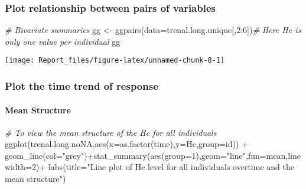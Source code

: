 \documentclass[
]{article}
\newenvironment{Shaded}{\begin{snugshade}}{\end{snugshade}}
\newcommand{\AttributeTok}[1]{\textcolor[rgb]{0.77,0.63,0.00}{#1}}
\newcommand{\CommentTok}[1]{\textcolor[rgb]{0.56,0.35,0.01}{\textit{#1}}}
\newcommand{\DecValTok}[1]{\textcolor[rgb]{0.00,0.00,0.81}{#1}}
\newcommand{\FunctionTok}[1]{\textcolor[rgb]{0.00,0.00,0.00}{#1}}
\newcommand{\NormalTok}[1]{#1}
\newcommand{\OtherTok}[1]{\textcolor[rgb]{0.56,0.35,0.01}{#1}}
\newcommand{\SpecialCharTok}[1]{\textcolor[rgb]{0.00,0.00,0.00}{#1}}
\newcommand{\StringTok}[1]{\textcolor[rgb]{0.31,0.60,0.02}{#1}}
\begin{document}
\hypertarget{plot-relationship-between-pairs-of-variables}{%
\subsubsection{Plot relationship between pairs of
variables}\label{plot-relationship-between-pairs-of-variables}}

\begin{Shaded}
\begin{Highlighting}[]
\CommentTok{\# Bivariate summaries}
\NormalTok{gg }\OtherTok{\textless{}{-}} \FunctionTok{ggpairs}\NormalTok{(}\AttributeTok{data=}\NormalTok{trenal.long.unique[,}\DecValTok{2}\SpecialCharTok{:}\DecValTok{6}\NormalTok{])}\CommentTok{\# Here Hc is only one value per individual}
\NormalTok{gg}
\end{Highlighting}
\end{Shaded}

\begin{center}\texttt{[image: Report\_files/figure-latex/unnamed-chunk-8-1]} \end{center}

\hypertarget{plot-the-time-trend-of-response}{%
\subsubsection{Plot the time trend of
response}\label{plot-the-time-trend-of-response}}

\hypertarget{mean-structure}{%
\paragraph{Mean Structure}\label{mean-structure}}

\begin{Shaded}
\begin{Highlighting}[]
\CommentTok{\# To view the mean structure of the Hc for all individuals}
\FunctionTok{ggplot}\NormalTok{(trenal.long.noNA,}\FunctionTok{aes}\NormalTok{(}\AttributeTok{x=}\FunctionTok{as.factor}\NormalTok{(time),}\AttributeTok{y=}\NormalTok{Hc,}\AttributeTok{group=}\NormalTok{id))  }\SpecialCharTok{+} \FunctionTok{geom\_line}\NormalTok{(}\AttributeTok{col=}\StringTok{"grey"}\NormalTok{)}\SpecialCharTok{+}\FunctionTok{stat\_summary}\NormalTok{(}\FunctionTok{aes}\NormalTok{(}\AttributeTok{group=}\DecValTok{1}\NormalTok{),}\AttributeTok{geom=}\StringTok{"line"}\NormalTok{,}\AttributeTok{fun=}\NormalTok{mean,}\AttributeTok{linewidth=}\DecValTok{2}\NormalTok{)}\SpecialCharTok{+}
  \FunctionTok{labs}\NormalTok{(}\AttributeTok{title=}\StringTok{"Line plot of Hc level for all individuals overtime and the mean structure"}\NormalTok{)}
\end{Highlighting}
\end{Shaded}
\end{document}

